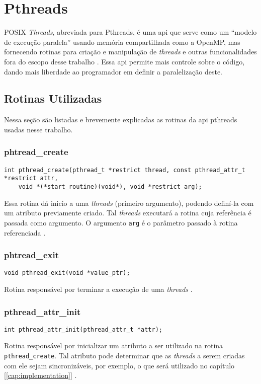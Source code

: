 \section{Pthreads}

POSIX \textit{Threads}, abreviada para Pthreads, é uma \acrshort{api} que serve como
um ``modelo de execução paralela'' usando memória compartilhada como a OpenMP,
mas fornecendo rotinas para criação e manipulação de \textit{threads} e outras funcionalidades
fora do escopo desse trabalho \cite{wiki:pthreads, LLNL:pthreads}. Essa \acrshort{api} permite
mais controle sobre o código, dando mais liberdade ao programador em definir a
paralelização deste.

\subsection{Rotinas Utilizadas}

Nessa seção são listadas e brevemente explicadas as rotinas da \acrshort{api}
\acrshort{pthreads} usadas nesse trabalho.

\subsubsection{phtread\_create}
\begin{lstlisting}
int pthread_create(pthread_t *restrict thread, const pthread_attr_t *restrict attr, 
	void *(*start_routine)(void*), void *restrict arg);
\end{lstlisting}
Essa rotina dá inicio a uma \textit{\gls{threads}} (primeiro argumento), podendo definí-la com 
um atributo previamente criado. Tal \textit{\gls{threads}} executará a rotina cuja referência é 
passada como argumento. O argumento \texttt{arg} é o parâmetro passado à rotina referenciada \cite{man:pthread_create}.
\\
\subsubsection{phtread\_exit}
\begin{lstlisting}
void pthread_exit(void *value_ptr);
\end{lstlisting}
Rotina responsável por terminar a execução de uma \textit{\gls{threads}} \cite{man:pthread_exit}.
\\
\subsubsection{pthread\_attr\_init}
\begin{lstlisting}
int pthread_attr_init(pthread_attr_t *attr);
\end{lstlisting}
Rotina responsável por inicializar um atributo a ser utilizado na rotina \texttt{pthread\_create}. 
Tal atributo pode determinar que as \textit{\gls{threads}} a serem criadas com ele sejam 
sincronizáveis, por exemplo, o que será utilizado no capítulo [\ref{cap:implementation}] 
\cite{man:pthread_attr_init}.
\\
